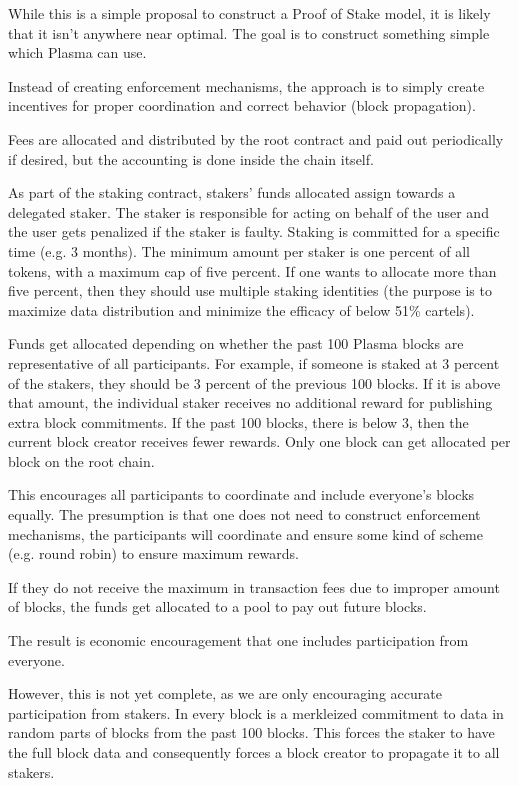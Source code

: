 \documentclass[letterpaper, 11pt]{article}
\begin{document}
While this is a simple proposal to construct a Proof of Stake model, it is
likely that it isn't anywhere near optimal. The goal is to construct something
simple which Plasma can use.

Instead of creating enforcement mechanisms, the approach is to simply create
incentives for proper coordination and correct behavior (block propagation).

Fees are allocated and distributed by the root contract and paid out
periodically if desired, but the accounting is done inside the chain itself.

As part of the staking contract, stakers' funds allocated assign towards a
delegated staker. The staker is responsible for acting on behalf of the user and
the user gets penalized if the staker is faulty. Staking is committed for a
specific time (e.g. 3 months). The minimum amount per staker is one percent of
all tokens, with a maximum cap of five percent. If one wants to allocate more
than five percent, then they should use multiple staking identities (the purpose
is to maximize data distribution and minimize the efficacy of below 51\%
cartels).

Funds get allocated depending on whether the past 100 Plasma blocks are
representative of all participants. For example, if someone is staked at 3
percent of the stakers, they should be 3 percent of the previous 100 blocks. If
it is above that amount, the individual staker receives no additional reward for
publishing extra block commitments. If the past 100 blocks, there is below 3,
then the current block creator receives fewer rewards. Only one block can get
allocated per block on the root chain.

This encourages all participants to coordinate and include everyone's blocks
equally. The presumption is that one does not need to construct enforcement
mechanisms, the participants will coordinate and ensure some kind of scheme
(e.g. round robin) to ensure maximum rewards.

If they do not receive the maximum in transaction fees due to improper amount of
blocks, the funds get allocated to a pool to pay out future blocks.

The result is economic encouragement that one includes participation from
everyone.

However, this is not yet complete, as we are only encouraging accurate
participation from stakers. In every block is a merkleized commitment to data in
random parts of blocks from the past 100 blocks. This forces the staker to have
the full block data and consequently forces a block creator to propagate it
to all stakers.
\end{document}
